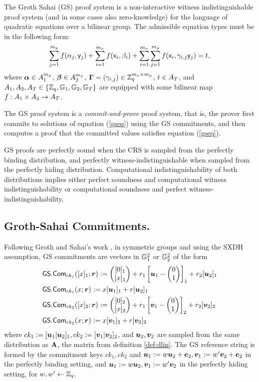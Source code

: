 
The Groth Sahai (GS) proof system is a non-interactive witness indistinguishable proof system (and in some cases also zero-knowledge) for the language of quadratic equations over a bilinear group. The admissible equation types must be in the following form:
\begin{equation}\label{gseq}
\sum_{j=1}^{m_y} f(\alpha_j, \mathsf{y}_j)+\sum_{i=1}^{m_x} f(\mathsf{x}_i, \beta_i)+\sum_{i=1}^{m_x} \sum_{j=1}^{m_y}  f(\mathsf{x}_i,\gamma_{i,j} \mathsf{y}_j)=t,
\end{equation}
 where $\boldsymbol \alpha  \in A_1^{m_y}$, $\boldsymbol \beta  \in A_2^{m_x}$, $\mathbf{{\Gamma}}=(\gamma_{i,j}) \in \mathbb{Z}_q^{m_x\times m_y}$, $t \in A_T$, and $A_1,A_2,A_T\in\{\mathbb{Z}_q,\mathbb{G}_1,\mathbb{G}_2, \mathbb{G}_T\}$ 
are equipped with some bilinear map $f:A_1\times A_2 \rightarrow A_T$.

The GS proof system is a \emph{commit-and-prove} proof system, that is, the prover first commits to solutions
of equation (\ref{gseq}) using the GS commitments, and then computes a proof that the committed values satisfies equation (\ref{gseq}).

GS proofs are perfectly sound when the CRS is sampled from the perfectly binding distribution, and perfectly witness-indistinguishable when sampled from the perfectly hiding distribution. Computational indistinguishability of  both distributions implies either perfect soundness and computational witness indistinguishability or computational soundness and perfect witness-indistinguishability.

\subsection{Groth-Sahai Commitments.}
Following Groth and Sahai's work \cite{EC:GroSah08}, in symmetric groups and using the SXDH assumption, GS commitments are vectors in $\mathbb{G}^2_1$ or $\mathbb{G}_2^2$ of the form
\begin{align*}
&{\mathsf{GS}}.\mathsf{Com}_{ck_1}([x]_1;{\boldsymbol{r}}):=\left(\begin{matrix}{[0]_1}\\{[x]_1}\end{matrix}\right)+r_1\left[{\boldsymbol{u}}_1-\left(\begin{matrix}0\\1\end{matrix}\right)\right]_1+{r}_2[{\boldsymbol{u}}_2]_1\\
&{\mathsf{GS}}.\mathsf{Com}_{ck_1}(x;{\boldsymbol{r}}):=x[{\boldsymbol{u}}_1]_1+{r}[{\boldsymbol{u}}_2]_1\\
& {\mathsf{GS}}.\mathsf{Com}_{ck_2}([x]_2;{\boldsymbol{r}}):=\left(\begin{matrix}{[0]_2}\\{[x]_2}\end{matrix}\right)+r_1\left[{\boldsymbol{v}}_1-\left(\begin{matrix}0\\1\end{matrix}\right)\right]_2+{r}_2[{\boldsymbol{v}}_2]_2\\
&{\mathsf{GS}}.\mathsf{Com}_{ck_2}(x;{\boldsymbol{r}}):=x[{\boldsymbol{v}}_1]_2+{r}[{\boldsymbol{v}}_2]_2
\end{align*}
where $ck_1:=[{\boldsymbol{u}}_1|{\boldsymbol{u}}_2]_1,ck_2:=[{\boldsymbol{v}}_1|{\boldsymbol{v}}_2]_2$, and ${\boldsymbol{u}}_2,{\boldsymbol{v}}_2$ are sampled from the same distribution as $\mathbf{{A}}$, the matrix from definition \ref{def:dlin}. The GS reference string is formed by the commitment keys $ck_1,ck_2$  and ${\boldsymbol{u}}_1:=w{\boldsymbol{u}}_2+{\boldsymbol{e}}_2,{\boldsymbol{v}}_1:=w'{\boldsymbol{v}}_2+{\boldsymbol{e}}_2$ in the perfectly binding setting, and ${\boldsymbol{u}}_1:=w{\boldsymbol{u}}_2,{\boldsymbol{v}}_1:=w'{\boldsymbol{v}}_2$ in the perfectly hiding setting, for $w,w'\gets\mathbb{Z}_q$.
